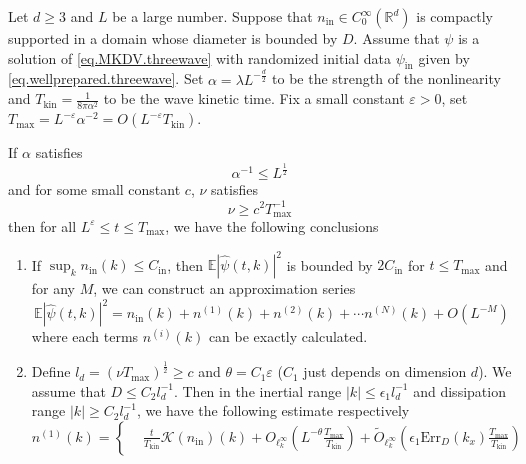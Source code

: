 \begin{thm}\label{th.main}
Let $d\ge 3$ and $L$ be a large number. Suppose that $n_{\mathrm{in}} \in C^\infty_0(\mathbb{R}^d)$ is compactly supported in a domain whose diameter is bounded by $D$. Assume that $\psi$ is a solution of \eqref{eq.MKDV.threewave} with randomized initial data $\psi_{\mathrm{in}}$ given by \eqref{eq.wellprepared.threewave}. Set $\alpha=\lambda L^{-\frac{d}{2}}$ to be the strength of the nonlinearity and $T_{\mathrm{kin}}=\frac{1}{8\pi\alpha^2}$ to be the wave kinetic time. Fix a small constant $\varepsilon> 0$, set $T_{\text{max}} = L^{-\varepsilon} \alpha^{-2}=O(L^{-\varepsilon}T_{\mathrm{kin}})$. 


If $\alpha$ satisfies
\begin{equation}\label{eq.conditionalpha.threewave}
\alpha^{-1}\le L^{\frac{1}{2}}
\end{equation}
and for some small constant $c$, $\nu$ satisfies
\begin{equation}\label{eq.conditionnu.threewave}
\nu\ge c^2T^{-1}_{\text{max}}
\end{equation}
then for all $L^{\varepsilon} \leq t \leq T_{\text{max}}$, we have the following conclusions
\begin{enumerate}
    \item If $\sup_{k}n_{\mathrm{in}}(k)\le C_{\mathrm{in}}$, then $\mathbb E |\widehat \psi(t, k)|^2$ is bounded by $2C_{\mathrm{in}}$ for $t\le T_{\text{max}}$ and for any $M$, we can construct an approximation series 
    \begin{equation}\label{eq.approx1.threewave}
        \mathbb E |\widehat \psi(t, k)|^2=n_{\mathrm{in}}(k)+n^{(1)}(k)+n^{(2)}(k)+\cdots n^{(N)}(k)+O(L^{-M})
    \end{equation}
    where each terms $n^{(i)}(k)$ can be exactly calculated.
    \item Define $l_{d}=(\nu T_{\mathrm{max}})^{\frac{1}{2}}\ge c$ and  $\theta=C_1\varepsilon$ ($C_1$ just depends on dimension $d$). We assume that $D\le C_2 l_d^{-1}$. Then in the inertial range $|k|\le \epsilon_1 l_{d}^{-1}$ and dissipation range $|k|\ge C_{2}l_d^{-1}$, we have the following estimate respectively
    \begin{equation}\label{eq.n1.threewave}
        n^{(1)}(k)=\left\{
        \begin{aligned}
            &\frac{t}{T_{\mathrm{kin}}}\mathcal K(n_{\mathrm{in}})(k)+O_{\ell^\infty_k}\left(L^{-\theta}\frac{T_{\text{max}}}{T_{\mathrm {kin}}}\right)+\widetilde{O}_{\ell^\infty_k}\left(\epsilon_1\text{Err}_{D}(k_x)\frac{T_{\text{max}}}{T_{\mathrm {kin}}}\right)

\end{aligned}
\end{equation}
\end{enumerate}
\end{thm}
